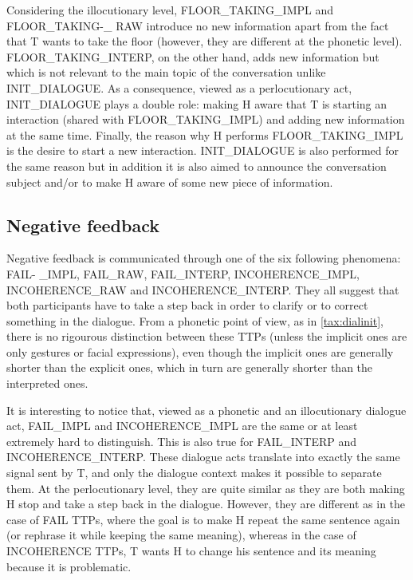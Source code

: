 	 Considering the illocutionary level, FLOOR\_TAKING\_IMPL and FLOOR\_TAKING-\_ RAW introduce no new information apart from the fact that T wants to take the floor (however, they are different at the phonetic level). FLOOR\_TAKING\_INTERP, on the other hand, adds new information but which is not relevant to the main topic of the conversation unlike INIT\_DIALOGUE. As a consequence, viewed as a perlocutionary act, INIT\_DIALOGUE plays a double role: making H aware that T is starting an interaction (shared with FLOOR\_TAKING\_IMPL) and adding new information at the same time. Finally, the reason why H performs FLOOR\_TAKING\_IMPL is the desire to start a new interaction. INIT\_DIALOGUE is also performed for the same reason but in addition it is also aimed to announce the conversation subject and/or to make H aware of some new piece of information.

    \subsection{Negative feedback}

         Negative feedback is communicated through one of the six following phenomena: FAIL- \_IMPL, FAIL\_RAW, FAIL\_INTERP, INCOHERENCE\_IMPL, INCOHERENCE\_RAW and INCOHERENCE\_INTERP. They all suggest that both participants have to take a step back in order to clarify or to correct something in the dialogue. From a phonetic point of view, as in \ref{tax:dialinit}, there is no rigourous distinction between these TTPs (unless the implicit ones are only gestures or facial expressions), even though the implicit ones are generally shorter than the explicit ones, which in turn are generally shorter than the interpreted ones.

         It is interesting to notice that, viewed as a phonetic and an illocutionary dialogue act, FAIL\_IMPL and INCOHERENCE\_IMPL are the same or at least extremely hard to distinguish. This is also true for FAIL\_INTERP and INCOHERENCE\_INTERP. These dialogue acts translate into exactly the same signal sent by T, and only the dialogue context makes it possible to separate them. At the perlocutionary level, they are quite similar as they are both making H stop and take a step back in the dialogue. However, they are different as in the case of FAIL TTPs, where the goal is to make H repeat the same sentence again (or rephrase it while keeping the same meaning), whereas in the case of INCOHERENCE TTPs, T wants H to change his sentence and its meaning because it is problematic.

